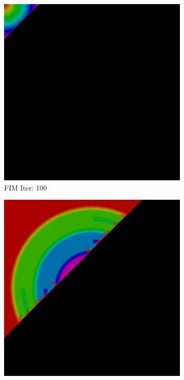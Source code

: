 \documentclass[11pt]{article}       %
\begin{document}
\begin{figure}
\centering
\begin{subfigure}[b]{.3\columnwidth}
	\includegraphics[width=\textwidth]{Figures/iter_100_fim}
	\caption{FIM Iter: 100}
\end{subfigure}
\begin{subfigure}[b]{.3\columnwidth}
	\includegraphics[width=\textwidth]{Figures/iter_400_fim}

\end{subfigure}
\end{figure}
\end{document}
